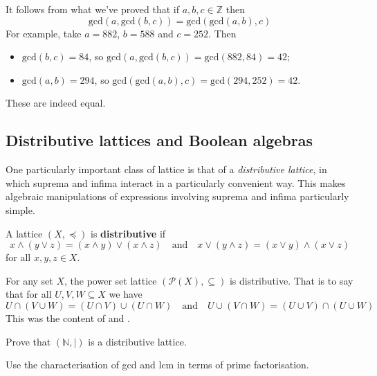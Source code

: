 \begin{example}
It follows from what we've proved that if $a,b,c \in \mathbb{Z}$ then
\[ \mathrm{gcd}(a,\mathrm{gcd}(b,c)) = \mathrm{gcd}(\mathrm{gcd}(a,b),c) \]
For example, take $a=882$, $b=588$ and $c=252$. Then
\begin{itemize}
\item $\mathrm{gcd}(b,c) = 84$, so $\mathrm{gcd}(a,\mathrm{gcd}(b,c)) = \mathrm{gcd}(882,84) = 42$;
\item $\mathrm{gcd}(a,b) = 294$, so $\mathrm{gcd}(\mathrm{gcd}(a,b),c) = \mathrm{gcd}(294, 252) = 42$.
\end{itemize}
These are indeed equal.
\end{example}

\subsection*{Distributive lattices and Boolean algebras}

One particularly important class of lattice is that of a \textit{distributive lattice}, in which suprema and infima interact in a particularly convenient way. This makes algebraic manipulations of expressions involving suprema and infima particularly simple.

\begin{definition}
\label{defDistributiveLattice}
A lattice $(X, \preceq)$ is \textbf{distributive} if
\[ x \wedge (y \vee z) = (x \wedge y) \vee (x \wedge z) \quad \text{and} \quad x \vee (y \wedge z) = (x \vee y) \wedge (x \vee z) \]
for all $x,y,z \in X$.
\end{definition}

\begin{example}
For any set $X$, the power set lattice $(\mathcal{P}(X), \subseteq)$ is distributive. That is to say that for all $U,V,W \subseteq X$ we have
\[ U \cap (V \cup W) = (U \cap V) \cup (U \cap W) \quad \text{and} \quad U \cup (V \cap W) = (U \cup V) \cap (U \cup W) \]
This was the content of  and .
\end{example}

\begin{exercise}
\label{exNIsDistributiveLatticeUnderDivisibility}
Prove that $(\mathbb{N}, {\mid})$ is a distributive lattice.
\begin{backhint}
Use the characterisation of gcd and lcm in terms of prime factorisation.
\end{backhint}
\end{exercise}

